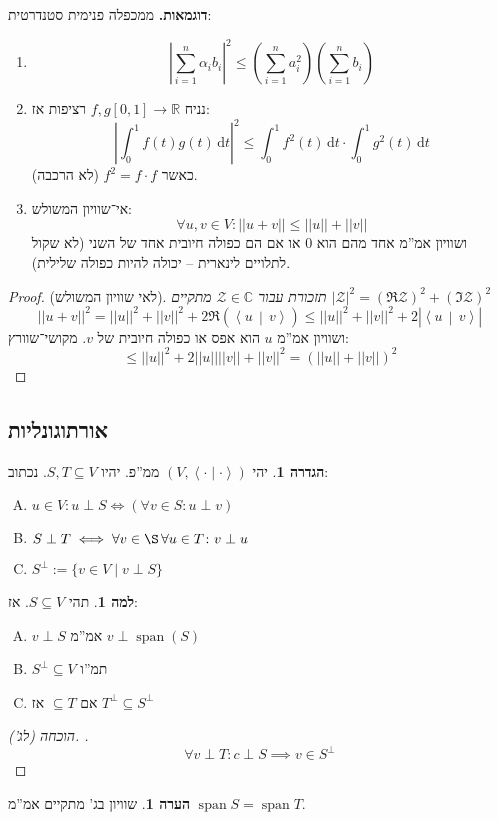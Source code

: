 \documentclass[a4paper]{article}
\newcommand\R     {\mathbb{R}}
\newcommand\C     {\mathbb{C}}
\newcommand\zc    {\mathcal{Z}}
\newcommand\ra    {\rangle}
\newcommand\la    {\langle}
\newcommand\dt    {\,\mathrm{d}t}
\DeclareMathOperator{\Sp}      {span}
\newcommand\co        {\colon}
\newcommand\norm[1]   {\left \vert \left \vert #1 \right \vert \right \vert}
\newcommand\smut      {\left \la \cdot \mid \cdot \right \ra}
\newcommand\mut [2]   {\left \la #1 \,\middle\vert\, #2 \right \ra}
\newcommand\ag        {\alpha}
\newcommand\sof[1]    {\left | #1 \right |}
\newcommand\cl [1]    {\left ( #1 \right )}
\theoremstyle{definition}
\newtheorem{definition}{הגדרה}
\newtheorem{Lemma}{למה}
\newtheorem{Remark}{הערה}
\newcommand\defi  [1] {\begin{definition}#1\end{definition}}
\newcommand\rmark [1] {\begin{Remark}#1\end{Remark}}
\newcommand\lem   [1] {\begin{Lemma}#1\end{Lemma}}
\begin{document}
	\textbf{דוגמאות. }ממכפלה פנימית סטנדרטית: 
	\begin{enumerate}
		\item \[ \sof{\sum_{i = 1}^{n}\ag_i b_i}^2 \le \cl{\sum_{i = 1}^{n}a_i^2} \cl{\sum_{i = 1}^{n}b_i} \]
		\item  נניח $f, g [0, 1] \to \R$ רציפות אז: 
		\[ \sof{\int^1_0 f(t)g(t) \dt}^2 \le \int_{0}^{1}f^2(t) \dt \cdot\int^1_0 g^2(t) \dt \]
		כאשר $f^2 = f \cdot f$ (לא הרכבה). 
		\item אי־שוויון המשולש: 
		\[ \forall u, v \in V \co \norm{u + v} \le \norm{u} + \norm{v} \]
		ושוויון אמ''מ אחד מהם הוא $0$ או אם הם כפולה חיובית אחד של השני (לא שקול לתלויים לינארית – יכולה להיות כפולה שלילית). 
	\end{enumerate}
	\begin{proof}
		(לאי שוויון המשולש). 
		\textit{תזכורת עבור $\zc \in \C$ מתקיים $\sof{\zc}^2 = (\Re \zc)^2 + (\Im \zc)^2$}
		\[ \norm{u + v}^2 = \norm{u}^2 + \norm{v}^2 + 2\Re(\mut{u}{v}) \le \norm{u}^2 + \norm{v}^2 + 2\sof{\mut{u}{v}}  \]
		ושוויון אמ''מ $u$ הוא אפס או כפולה חיובית של $v$. מקושי־שוורץ: 
		\[ \le \norm{u}^2 + 2\norm{u}\norm{v} + \norm{v}^2 = \cl{\norm{u} + \norm{v}}^2 \]
	\end{proof}
	
	\subsection{אורתוגונליות}
	\defi{יהי $(V, \smut)$ ממ''פ. יהיו $S, T \subseteq V$. נכתוב: 
		\begin{enumerate}[A.]
			\item \hfil $u \in V \co u \perp S \iff (\forall v \in S\co u \perp v)$
			\item \hfil $S \perp T \iff \forall v \in \S\, \forall u \in T \co v \perp u$ 
			\item \hfil $S^{\perp} := \{v \in V \mid v \perp S\}$
	\end{enumerate}}
	\lem{תהי $S \subseteq V$. אז: 
		\begin{enumerate}[A.]
			\item $v \perp S$ אמ''מ $v \perp \Sp(S)$
			\item $S^{\perp} \subseteq V$ תמ''ו
			\item אם $\subseteq T$ אז $T^\perp \subseteq S^\perp$
	\end{enumerate}}
	\begin{proof}[הוכחה (לג'). ]
		\[ \forall v \perp T \co c \perp S \implies v \in S^{\perp} \]
	\end{proof}
	\rmark{שוויון בג' מתקיים אמ''מ $\Sp S = \Sp T$. }
	
\end{document}
